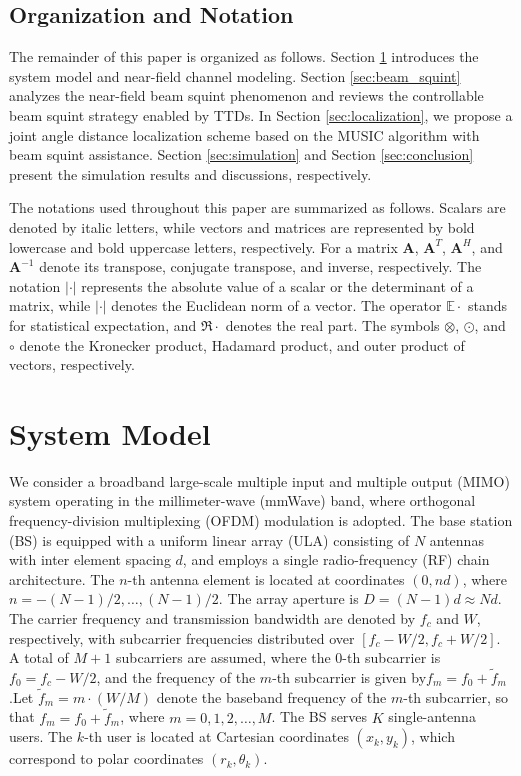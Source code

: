 \documentclass[lettersize,journal]{IEEEtran}
\begin{document}
\subsection{Organization and Notation}
The remainder of this paper is organized as follows. Section \ref{sec:system_model} introduces the system model and near-field channel modeling. Section \ref{sec:beam_squint} analyzes the near-field beam squint phenomenon and reviews the controllable beam squint strategy enabled by TTDs. In Section \ref{sec:localization}, we propose a joint angle distance localization scheme based on the MUSIC algorithm with beam squint assistance. Section \ref{sec:simulation} and Section \ref{sec:conclusion} present the simulation results and discussions, respectively.
  
The notations used throughout this paper are summarized as follows. Scalars are denoted by italic letters, while vectors and matrices are represented by bold lowercase and bold uppercase letters, respectively. For a matrix $\mathbf{A}$, $\mathbf{A}^T$, $\mathbf{A}^H$, and $\mathbf{A}^{-1}$ denote its transpose, conjugate transpose, and inverse, respectively. The notation $|\cdot|$ represents the absolute value of a scalar or the determinant of a matrix, while $|\cdot|$ denotes the Euclidean norm of a vector. The operator $\mathbb{E}{\cdot}$ stands for statistical expectation, and $\Re{\cdot}$ denotes the real part. The symbols $ \otimes $, $ \odot $, and $ \circ $ denote the Kronecker product, Hadamard product, and outer product of vectors, respectively. 

\section{System Model}
\label{sec:system_model}
We consider a broadband large-scale multiple input and multiple output (MIMO) system operating in the millimeter-wave (mmWave) band, where orthogonal frequency-division multiplexing (OFDM) modulation is adopted. The base station (BS) is equipped with a uniform linear array (ULA) consisting of $N$ antennas with inter element spacing $d$, and employs a single radio-frequency (RF) chain architecture. The $n$-th antenna element is located at coordinates $(0, nd)$, where $n=-(N-1)/2, \ldots, (N-1)/2$. The array aperture is $D=(N-1)d \approx Nd$. The carrier frequency and transmission bandwidth are denoted by $f_c$ and $W$, respectively, with subcarrier frequencies distributed over $[f_c-W/2, f_c+W/2]$. A total of $M+1$ subcarriers are assumed, where the 0-th subcarrier is $f_0=f_c-W/2$, and the frequency of the $m$-th subcarrier is given by$f_m=f_0+\widetilde{f}_m$.Let $\widetilde{f}_m = m\cdot (W/M)$ denote the baseband frequency of the $m$-th subcarrier, so that $f_m=f_0+\widetilde{f}_m$, where $m=0,1,2,\ldots,M$. The BS serves $K$ single-antenna users. The $k$-th user is located at Cartesian coordinates $(x_k,y_k)$, which correspond to polar coordinates $(r_k,\theta_k)$.
\end{document}
